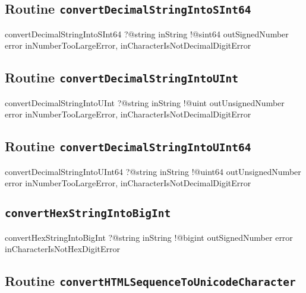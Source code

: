 \subsection{Routine \texttt{convertDecimalStringIntoSInt64}}

\begin{galgas3}
convertDecimalStringIntoSInt64 ?@string inString
                               !@sint64 outSignedNumber
                               error inNumberTooLargeError,
                                     inCharacterIsNotDecimalDigitError
\end{galgas3}

\subsection{Routine \texttt{convertDecimalStringIntoUInt}}

\begin{galgas3}
convertDecimalStringIntoUInt ?@string inString
                             !@uint outUnsignedNumber
                             error inNumberTooLargeError,
                                   inCharacterIsNotDecimalDigitError
\end{galgas3}

\subsection{Routine \texttt{convertDecimalStringIntoUInt64}}

\begin{galgas3}
convertDecimalStringIntoUInt64 ?@string inString
                               !@uint64 outUnsignedNumber
                               error inNumberTooLargeError,
                                     inCharacterIsNotDecimalDigitError
\end{galgas3}

\subsection{\texttt{convertHexStringIntoBigInt}}

\begin{galgas3}
convertHexStringIntoBigInt ?@string inString
                           !@bigint outSignedNumber
                           error inCharacterIsNotHexDigitError
\end{galgas3}



\subsection{Routine \texttt{convertHTMLSequenceToUnicodeCharacter}}

